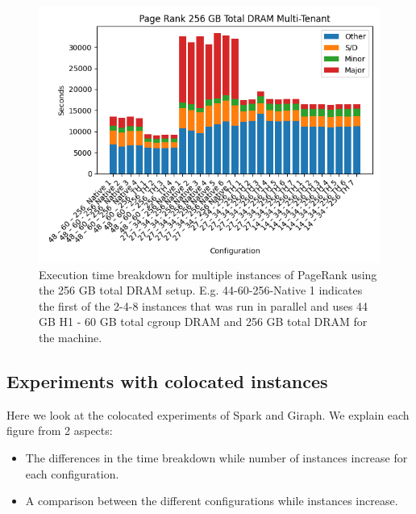 \begin{figure}[ht!]
    \includegraphics[width=\linewidth]{./fig/pr256.png}
    \caption{Execution time breakdown for multiple instances of
    PageRank using the 256 GB total DRAM setup. E.g. 44-60-256-Native
    1 indicates the first of the 2-4-8 instances that was run in
    parallel and uses 44 GB H1 - 60 GB total cgroup DRAM and 256 GB
    total DRAM for the machine.} 
    \label{fig:pr256}
\end{figure}


\subsection{Experiments with colocated instances}

Here we look at the colocated experiments of Spark and Giraph.
We explain each figure from 2 aspects:
\begin{itemize}
\item{The differences in the time breakdown while number of instances increase for each configuration.}
\item{A comparison between the different configurations while instances increase.}
\end{itemize}

